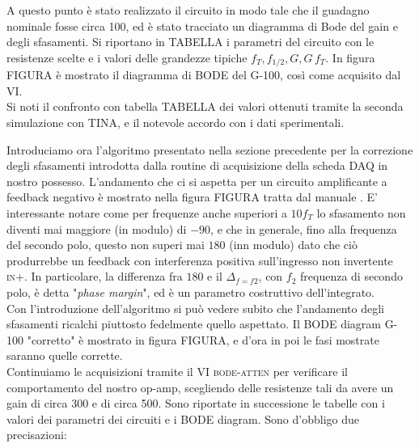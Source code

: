 \documentclass[journal, a4paper]{IEEEtran}
\begin{document}
A questo punto è stato realizzato il circuito in modo tale che il guadagno nominale fosse circa 100, ed è stato tracciato un diagramma di Bode del gain e degli sfasamenti. Si riportano in TABELLA i parametri del circuito con le resistenze scelte e i valori delle grandezze tipiche $f_T, f_{1/2}, G, G \, f_T$. In figura FIGURA è mostrato il diagramma di BODE  del G-100, così come acquisito dal VI.\\

Si noti il confronto con tabella TABELLA dei valori ottenuti tramite la seconda simulazione con TINA, e il notevole accordo con i dati sperimentali.

Introduciamo ora l'algoritmo presentato nella sezione precedente per la correzione degli sfasamenti introdotta dalla routine di acquisizione della scheda DAQ in nostro possesso. L'andamento che ci si aspetta per un circuito amplificante a feedback negativo è mostrato nella figura FIGURA tratta dal manuale 
. E' interessante notare come per frequenze anche superiori a $10  f_T$ lo sfasamento non diventi mai maggiore (in modulo) di $-90$, e che in generale, fino alla frequenza del secondo polo, questo non superi mai $180$ (inn modulo) dato che ciò produrrebbe un feedback con interferenza positiva sull'ingresso non invertente \textsc{in+}. In particolare, la differenza fra $180$ e il $\Delta _{f=f2}$, con $f_2$ frequenza di secondo polo, è detta "\textit{phase margin}", ed è un parametro costruttivo dell'integrato.\\

Con l'introduzione dell'algoritmo si può vedere subito che l'andamento degli sfasamenti ricalchi piuttosto fedelmente quello aspettato. Il BODE diagram G-100 "corretto" è mostrato in figura FIGURA, e d'ora in poi le fasi mostrate saranno quelle corrette.\\
 

Continuiamo le acquisizioni tramite il VI \textsc{bode-atten} per verificare il comportamento del nostro op-amp, scegliendo delle resistenze tali da avere un gain di circa 300 e di circa 500. Sono riportate in successione le tabelle con i valori dei parametri dei circuiti e i BODE diagram. Sono d'obbligo due precisazioni:
\end{document}
